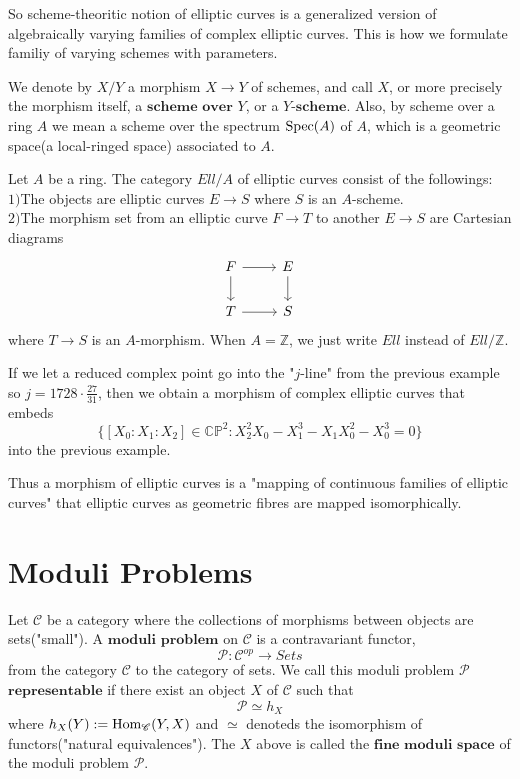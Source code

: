 \documentclass[a4paper,11pt]{article}
\begin{document}
So scheme-theoritic notion of elliptic curves is a generalized version of algebraically varying families of complex elliptic curves.
This is how we formulate familiy of varying schemes with parameters.

\begin{nota}
We denote by $X/Y$ a morphism $X\to$$Y$ of schemes, and call $X$, or more precisely the morphism itself, a $\textbf{scheme over $Y$}$, or a $\textbf{$Y$-scheme}$.
Also, by scheme over a ring $A$ we mean a scheme over the spectrum $\textnormal{Spec}(A)$ of $A$, which is a geometric space(a local-ringed space) associated to $A$.
\end{nota}

\begin{defn}
Let $A$ be a ring.
The category $Ell/A$ of elliptic curves consist of the followings:\\
$1)$The objects are elliptic curves $E\to$$S$ where $S$ is an $A$-scheme.\\
$2)$The morphism set from an elliptic curve $F\to$$T$ to another $E\to$$S$ are Cartesian diagrams
\[
\begin{tikzcd}
F \arrow[r] \arrow[d] & E \arrow[d] \\
T \arrow[r] & S
\end{tikzcd}
\]
where $T\to$$S$ is an $A$-morphism.
When $A=\mathbb{Z}$, we just write $Ell$ instead of $Ell/\mathbb{Z}$.
\end{defn}

\begin{exm}
If we let a reduced complex point go into the "$j$-line" from the previous example so $j=1728\cdot\frac{27}{31}$, then we obtain a morphism of complex elliptic curves that embeds
\[
\{[X_0:X_1:X_2] \in \mathbb{CP}^2 : X_2^2X_0-X_1^3-X_1X_0^2-X_0^3=0\}
\]
into the previous example.
\end{exm}
Thus a morphism of elliptic curves is a "mapping of continuous families of elliptic curves" that elliptic curves as geometric fibres are mapped isomorphically.

\section{Moduli Problems}

\begin{defn}
Let $\mathcal{C}$ be a category where the collections of morphisms between objects are sets("small").
A $\textbf{moduli problem}$ on $\mathcal{C}$ is a contravariant functor,
\[
\mathcal{P}:\mathcal{C}^{op} \to \textit{Sets}
\]
from the category $\mathcal{C}$ to the category of sets.
We call this moduli problem $\mathcal{P}$ $\textbf{representable}$ if there exist an object $X$ of $\mathcal{C}$ such that
\[
\mathcal{P} \simeq h_X
\]
where $h_X(Y):=\textnormal{Hom}_{\mathcal{C}}(Y,X)$ and $\simeq$ denoteds the isomorphism of functors("natural equivalences").
The $X$ above is called the $\textbf{fine moduli space}$ of the moduli problem $\mathcal{P}$.
\end{defn}
\end{document}
